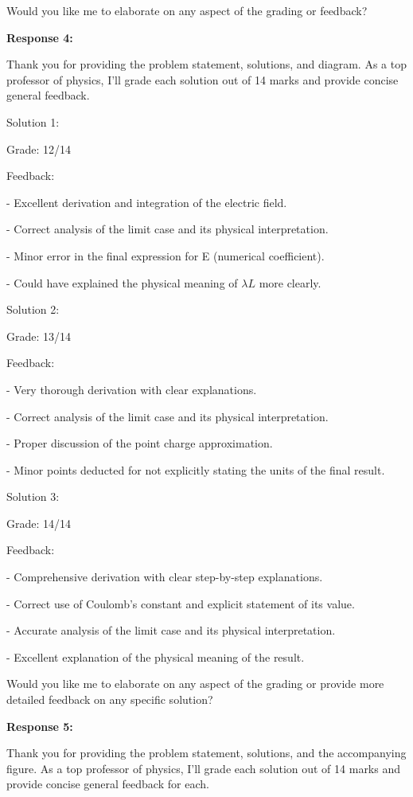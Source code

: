 \documentclass[a4paper,11pt]{article}
\begin{document}
Would you like me to elaborate on any aspect of the grading or feedback?

\bigskip
\textbf{Response 4:}

Thank you for providing the problem statement, solutions, and diagram. As a top professor of physics, I'll grade each solution out of 14 marks and provide concise general feedback.

Solution 1:

Grade: 12/14

Feedback:

- Excellent derivation and integration of the electric field.

- Correct analysis of the limit case and its physical interpretation.

- Minor error in the final expression for E (numerical coefficient).

- Could have explained the physical meaning of \( \lambda L\) more clearly.

Solution 2:

Grade: 13/14

Feedback:

- Very thorough derivation with clear explanations.

- Correct analysis of the limit case and its physical interpretation.

- Proper discussion of the point charge approximation.

- Minor points deducted for not explicitly stating the units of the final result.

Solution 3:

Grade: 14/14

Feedback:

- Comprehensive derivation with clear step-by-step explanations.

- Correct use of Coulomb's constant and explicit statement of its value.

- Accurate analysis of the limit case and its physical interpretation.

- Excellent explanation of the physical meaning of the result.

Would you like me to elaborate on any aspect of the grading or provide more detailed feedback on any specific solution?

\bigskip
\textbf{Response 5:}

Thank you for providing the problem statement, solutions, and the accompanying figure. As a top professor of physics, I'll grade each solution out of 14 marks and provide concise general feedback for each.
\end{document}

